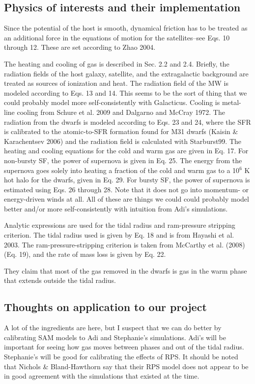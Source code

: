 \documentclass[11pt,longbibliography]{article}
\begin{document}
\subsection{Physics of interests and their implementation}
Since the potential of the host is smooth, dynamical friction has to be treated as an additional force in the equations of motion for the satellites--see Eqs. 10 through 12.  These are set according to Zhao 2004.  

The heating and cooling of gas is described in Sec. 2.2 and 2.4.  Briefly, the radiation fields of the host galaxy, satellite, and the extragalactic background are treated as sources of ionization and heat.  The radiation field of the MW is modeled according to Eqs. 13 and 14.  This seems to be the sort of thing that we could probably model more self-consistently with Galacticus.  Cooling is metal-line cooling from Schure et al. 2009 and Dalgarno and McCray 1972.  The radiation from the dwarfs is modeled according to Eqs. 23 and 24, where the SFR is calibrated to the atomic-to-SFR formation found for M31 dwarfs (Kaisin \& Karachentsev 2006) and the radiation field is calculated with Starburst99.  The heating and cooling equations for the cold and warm gas are given in Eq. 17.  For non-bursty SF, the power of supernova is given in Eq. 25.  The energy from the supernova goes solely into heating a fraction of the cold and warm gas to a 10$^6$ K hot halo for the dwarfs, given in Eq. 29.  For bursty SF, the power of supernova is estimated using Eqs. 26 through 28.  Note that it does not go into momentum- or energy-driven winds at all.  All of these are things we could could probably model better and/or more self-consistently with intuition from Adi's simulations. 

Analytic expressions are used for the tidal radius and ram-pressure stripping criterion.  The tidal radius used is given by Eq. 18 and is from Hayashi et al. 2003.  The ram-pressure-stripping criterion is taken from McCarthy et al. (2008) (Eq. 19), and the rate of mass loss is given by Eq. 22.

They claim that most of the gas removed in the dwarfs is gas in the warm phase that extends outside the tidal radius.

\subsection{Thoughts on application to our project}

A lot of the ingredients are here, but I suspect that we can do better by calibrating SAM models to Adi and Stephanie's simulations.  Adi's will be important for seeing how gas moves between phases and out of the tidal radius.  Stephanie's will be good for calibrating the effects of RPS.  It should be noted that Nichols \& Bland-Hawthorn say that their RPS model does not appear to be in good agreement with the simulations that existed at the time.
\end{document}
